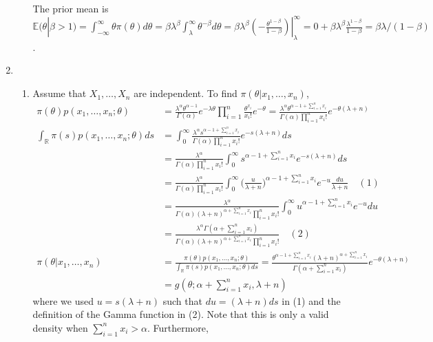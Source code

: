 \documentclass[12pt]{article}
\newcommand{\E}{\mathbb{E}}
\begin{document}
\begin{enumerate}
\begin{enumerate}
        The prior mean is $\E(\theta|\beta>1) = \int_{-\infty}^\infty \theta\pi(\theta) d\theta = \beta\lambda^\beta \int_\lambda^\infty \theta^{-\beta} d\theta = \beta\lambda^\beta (-\frac{\theta^{1-\beta}}{1-\beta})|_\lambda^\infty = 0 + \beta\lambda^\beta \frac{\lambda^{1-\beta}}{1-\beta} = \beta\lambda/(1-\beta)$.
    \end{enumerate}
    \item
    \begin{enumerate}
        \item Assume that $X_1,\ldots,X_n$ are independent. To find $\pi(\theta|x_1,\ldots,x_n)$, \begin{align*}
            \pi(\theta)p(x_1,\ldots,x_n;\theta) &= \frac{\lambda^\alpha \theta^{\alpha-1}}{\Gamma(\alpha)} e^{-\lambda \theta} \prod_{i=1}^n \frac{\theta^{x_i}}{x_i!} e^{-\theta} = \frac{\lambda^\alpha \theta^{\alpha-1+\sum_{i=1}^n x_i}}{\Gamma(\alpha) \prod_{i=1}^n x_i!} e^{-\theta(\lambda+n)}\\
            \int_{\mathbb{R}} \pi(s) p(x_1,\ldots,x_n;\theta) ds &= \int_0^\infty \frac{\lambda^\alpha s^{\alpha-1+\sum_{i=1}^n x_i}}{\Gamma(\alpha) \prod_{i=1}^n x_i!} e^{-s(\lambda+n)} ds\\
            &= \frac{\lambda^\alpha}{\Gamma(\alpha) \prod_{i=1}^n x_i!} \int_0^\infty s^{\alpha-1+\sum_{i=1}^n x_i} e^{-s(\lambda+n)} ds\\
            &= \frac{\lambda^\alpha}{\Gamma(\alpha) \prod_{i=1}^n x_i!} \int_0^\infty \Big( \frac{u}{\lambda+n} \Big)^{\alpha-1+\sum_{i=1}^n x_i} e^{-u} \frac{du}{\lambda+n} \quad (1)\\
            &= \frac{\lambda^\alpha}{\Gamma(\alpha) (\lambda+n)^{\alpha+\sum_{i=1}^n x_i} \prod_{i=1}^n x_i!} \int_0^\infty u^{\alpha-1+\sum_{i=1}^n x_i} e^{-u} du\\
            &= \frac{\lambda^\alpha \Gamma(\alpha + \sum_{i=1}^n x_i)}{\Gamma(\alpha) (\lambda+n)^{\alpha+\sum_{i=1}^n x_i} \prod_{i=1}^n x_i!} \quad (2)\\
            \pi(\theta|x_1,\ldots,x_n) &= \frac{\pi(\theta)p(x_1,\ldots,x_n;\theta)}{\int_{\mathbb{R}} \pi(s) p(x_1,\ldots,x_n;\theta) ds} = \frac{\theta^{\alpha-1+\sum_{i=1}^n x_i} (\lambda+n)^{\alpha+\sum_{i=1}^n x_i}}{\Gamma(\alpha + \sum_{i=1}^n x_i)} e^{-\theta(\lambda+n)}\\
            &= g(\theta; \alpha+\sum_{i=1}^n x_i, \lambda+n)
        \end{align*} where we used $u = s(\lambda+n)$ such that $du = (\lambda+n)ds$ in (1) and the definition of the Gamma function in (2). Note that this is only a valid density when $\sum_{i=1}^n x_i > \alpha$. Furthermore, \begin{align*}

\end{align*}
\end{enumerate}
\end{enumerate}
\end{document}
